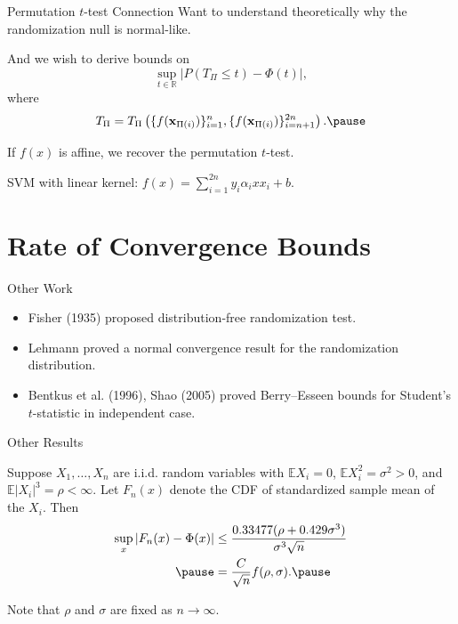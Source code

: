 \documentclass{beamer}
\newcommand{\E}{\mathbb{E}}
\begin{document}
\begin{frame}{Permutation $t$-test Connection}
  Want to understand theoretically why the randomization null is normal-like. \pause

  And we wish to derive bounds on
  \begin{equation*}
    \sup_{t \in \mathbb{R}} |P(T_{\Pi} \leq t) - \Phi(t)|,
  \end{equation*}
  where
  \begin{equation*}
    T_{\Pi} = T_{\Pi} \left (\{f({\bf x}_{\Pi(i)})\}_{i=1}^{n}, \{f({\bf x}_{\Pi(i)})\}_{i=n+1}^{2n} \right). \pause
  \end{equation*}

  If $f(x)$ is affine, we recover the permutation $t$-test. \pause

  SVM with linear kernel: $f(x) = \sum_{i=1}^{2n} y_i \alpha_i xx_i + b$.
\end{frame}

\section{Rate of Convergence Bounds}
\begin{frame}{Other Work}
  \begin{itemize}
  \item Fisher (1935) proposed distribution-free
    randomization test.  \pause
  \item Lehmann proved a normal convergence
    result for the randomization distribution. \pause
  \item Bentkus et al. (1996), Shao (2005) proved Berry--Esseen bounds for
    Student's $t$-statistic in independent case.
  \end{itemize}
\end{frame}

\begin{frame}{Other Results}
  \begin{theorem}
  Suppose $X_1, \ldots, X_n$ are i.i.d. random variables with
  $\E X_i = 0$, $\E X_i^2 = \sigma^2 > 0$, and $\E |X_i|^3 = \rho
  < \infty$.  Let $F_n(x)$ denote the CDF of standardized sample mean
  of the $X_i$.  Then
  \begin{align*}
    \sup_x |F_n(x) - \Phi(x)| &\leq \frac{0.33477(\rho + 0.429\sigma^3)}{\sigma^3 \sqrt{n}} \\ \pause
    &= \frac{C}{\sqrt{n}} f(\rho, \sigma). \pause
  \end{align*}
  \end{theorem}
  Note that $\rho$ and $\sigma$ are fixed as $n \to \infty$.
\end{frame}
\end{document}
